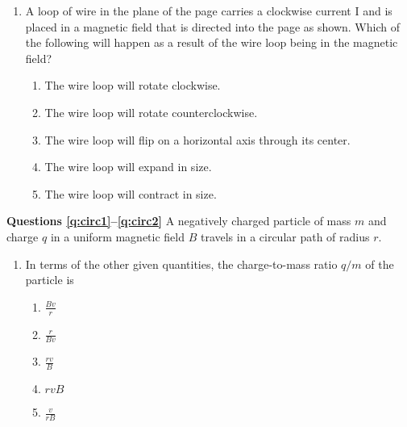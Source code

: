 \documentclass{../../../oss-classkick}
\begin{document}
\begin{multicols}{2}
\begin{enumerate}[leftmargin=18pt,resume]
  \item A loop of wire in the plane of the page carries a clockwise current I
    and is placed in a magnetic field that is directed into the page as shown.
    Which of the following will happen as a result of the wire loop being in
    the magnetic field?
    \begin{center}
    \end{center}
    \begin{enumerate}[noitemsep,topsep=0pt,leftmargin=18pt,label=(\Alph*)]
    \item The wire loop will rotate clockwise.
    \item The wire loop will rotate counterclockwise.
    \item The wire loop will flip on a horizontal axis through its center.
    \item The wire loop will expand in size.
    \item The wire loop will contract in size.
    \end{enumerate}
    \vspace{.7in}
  \end{enumerate}

  \textbf{Questions \ref{q:circ1}--\ref{q:circ2}}
  A negatively charged particle of mass $m$ and charge $q$ in a uniform magnetic
  field $B$ travels in a circular path of radius $r$.
  \begin{center}
  \end{center}
  \begin{enumerate}[leftmargin=18pt,resume]
  \item In terms of the other given quantities, the charge-to-mass ratio $q/m$
    of the particle is
    \begin{enumerate}[nosep,leftmargin=18pt,label=(\Alph*)]
    \item $\displaystyle\frac{Bv}{r}$
    \item $\displaystyle\frac{r}{Bv}$
    \item $\displaystyle\frac{rv}{B}$
    \item $rvB$
    \item $\displaystyle\frac{v}{rB}$
    \end{enumerate}
    \label{q:circ1}
    

\end{enumerate}
\end{multicols}
\end{document}
